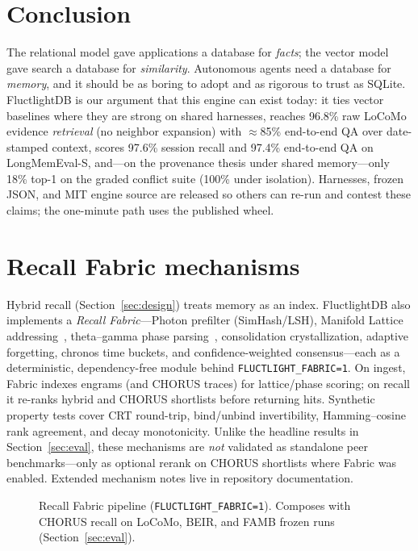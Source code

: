 \documentclass[11pt]{article}
\begin{document}
\section{Conclusion}
The relational model gave applications a database for \emph{facts}; the vector
model gave search a database for \emph{similarity}. Autonomous agents need a
database for \emph{memory}, and it should be as boring to adopt and as rigorous to
trust as SQLite. FluctlightDB is our argument that this engine can exist today: it
ties vector baselines where they are strong on shared harnesses, reaches 96.8\%
raw LoCoMo evidence \emph{retrieval} (no neighbor expansion) with $\approx$85\%
end-to-end QA over date-stamped context, scores 97.6\% session recall and 97.4\% end-to-end QA
on LongMemEval-S, and---on the provenance thesis under shared memory---only 18\%
top-1 on the graded conflict suite (100\% under isolation). Harnesses, frozen
JSON, and MIT engine source are released so others can re-run and contest these
claims; the one-minute path uses the published wheel.

\appendix
\section{Recall Fabric mechanisms}
\label{app:fabric}
Hybrid recall (Section~\ref{sec:design}) treats memory as an index. FluctlightDB also
implements a \emph{Recall Fabric}---Photon prefilter (SimHash/LSH), Manifold Lattice
addressing~\cite{fiete2008,sreenivasan2011}, theta--gamma phase
parsing~\cite{lisman1995,lisman2013,plate1995}, consolidation crystallization,
adaptive forgetting, chronos time buckets, and confidence-weighted
consensus---each as a deterministic, dependency-free module behind
\texttt{FLUCTLIGHT\_FABRIC=1}. On ingest, Fabric indexes engrams (and CHORUS traces)
for lattice/phase scoring; on recall it re-ranks hybrid and CHORUS shortlists before
returning hits. Synthetic property tests cover CRT round-trip, bind/unbind
invertibility, Hamming--cosine rank agreement, and decay monotonicity. Unlike the
headline results in Section~\ref{sec:eval}, these mechanisms are \emph{not}
validated as standalone peer benchmarks---only as optional rerank on CHORUS shortlists
where Fabric was enabled. Extended mechanism notes live in repository documentation.

\begin{figure}[h]
\centering
{}
\caption{Recall Fabric pipeline (\texttt{FLUCTLIGHT\_FABRIC=1}). Composes with CHORUS
recall on LoCoMo, BEIR, and FAMB frozen runs (Section~\ref{sec:eval}).}
\label{fig:fabric}
\end{figure}
\end{document}
